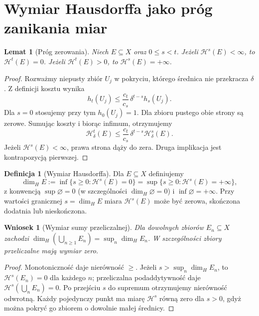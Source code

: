 \documentclass[11pt,a4paper,oneside]{book}
\numberwithin{equation}{chapter}
\theoremstyle{plain}
\newtheorem{lemat}[twierdzenie]{Lemat}
\newtheorem{wniosek}[twierdzenie]{Wniosek}
\theoremstyle{definition}
\newtheorem{definicja}[twierdzenie]{Definicja}
\theoremstyle{remark}
\begin{document}
\section{Wymiar Hausdorffa jako próg zanikania miar}
\begin{lemat}[Próg zerowania]
\label{lem:hausdorff-threshold-26}
Niech $E\subseteq X$ oraz $0\le s<t$. Jeżeli
$\mathcal H^s(E)<\infty$, to $\mathcal H^t(E)=0$.
Jeżeli $\mathcal H^t(E)>0$, to $\mathcal H^s(E)=+\infty$.
\end{lemat}
\begin{proof}
Rozważmy niepusty zbiór $U_j$ w pokryciu,
którego średnica nie przekracza $\delta$.
Z definicji kosztu wynika
\[
 h_t(U_j)\le\frac{c_t}{c_s}\,\delta^{t-s}h_s(U_j).
\]
Dla $s=0$ stosujemy przy tym $h_0(U_j)=1$.
Dla zbioru pustego obie strony są zerowe.
Sumując koszty i biorąc infimum, otrzymujemy
\[
\mathcal H^t_\delta(E)\le
\frac{c_t}{c_s}\,\delta^{t-s}\mathcal H^s_\delta(E).
\]
Jeżeli $\mathcal H^s(E)<\infty$, prawa strona dąży
do zera. Druga implikacja jest kontrapozycją pierwszej.
\end{proof}

\begin{definicja}[Wymiar Hausdorffa]
\label{def:hausdorff-dimension-26}
Dla $E\subseteq X$ definiujemy
\[
 \dim_H E:=\inf\{s\ge0:\mathcal H^s(E)=0\}
 =\sup\{s\ge0:\mathcal H^s(E)=+\infty\},
\]
z konwencją $\sup\varnothing=0$ (w szczególności
$\dim_H\varnothing=0$) i $\inf\varnothing=+\infty$.
Przy wartości granicznej $s=\dim_H E$ miara
$\mathcal H^s(E)$ może być zerowa, skończona dodatnia
lub nieskończona.
\end{definicja}

\begin{wniosek}[Wymiar sumy przeliczalnej]
\label{cor:hausdorff-union-26}
Dla dowolnych zbiorów $E_n\subseteq X$ zachodzi
$\dim_H(\bigcup_{n\ge1}E_n)=\sup_n\dim_HE_n$.
W szczególności zbiory przeliczalne mają wymiar zero.
\end{wniosek}
\begin{proof}
Monotoniczność daje nierówność $\ge$.
Jeżeli $s>\sup_n\dim_HE_n$, to
$\mathcal H^s(E_n)=0$ dla każdego $n$; przeliczalna
podaddytywność daje $\mathcal H^s(\bigcup_nE_n)=0$.
Po przejściu $s$ do supremum otrzymujemy nierówność
odwrotną. Każdy pojedynczy punkt ma miarę
$\mathcal H^s$ równą zero dla $s>0$, gdyż można
pokryć go zbiorem o dowolnie małej średnicy.
\end{proof}
\end{document}
